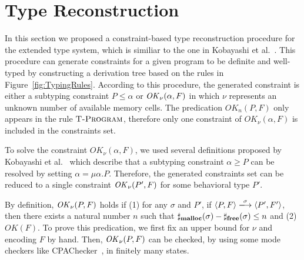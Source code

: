 \section{Type Reconstruction}
\label{sec:reconstruction}
In this section we proposed a constraint-based type reconstruction
procedure for the extended type system, which is similiar to the one
in Kobayashi et al.~\cite{DBLP:journals/lmcs/KobayashiSW06}.  This
procedure can generate constraints for a given program to be definite
and well-typed by constructing a derivation tree based on the rules in
Figure~\ref{fig:TypingRules}. According to this procedure, the
generated constraint is either a subtyping constraint \(P \le \alpha
\) or \(\mathit{OK}_\nu(\alpha, F)\) in which \(\nu\) represents an unknown
number of available memory cells. The predication \(OK_n(P, F)\) only
appears in the rule \(\textsc{T-Program}\), therefore only one constraint of
\(OK_\nu(\alpha, F)\) is included in the constraints set.

To solve the constraint \(OK_\nu(\alpha, F)\), we used several
definitions proposed by Kobayashi et al.~\cite[Lemma
  3.8]{DBLP:journals/lmcs/KobayashiSW06} which describe that a
subtyping constraint \(\alpha \ge P\) can be resolved by setting
\(\alpha = \mu \alpha. P\).  Therefore, the generated constraints set
can be reduced to a single constraint \(\mathit{OK}_{\nu}(P', F)\) for some
behavioral type \(P'\).

By definition, \(\mathit{OK}_{\nu}(P, F)\) holds if (1) for any \(\sigma\) and
\(P'\), if \(\langle P, F \rangle \xlongrightarrow{\sigma} \langle P',
F'\rangle \), then there exists a natural number \(n\) such that
\(\sharp_{\mathbf{malloc}}(\sigma) - \sharp_{\mathbf{free}}(\sigma) \le n\) and (2)
\(OK(F)\). To prove this predication, we first fix an upper bound for
\(\nu\) and encoding \(F\) by hand.  Then, \(\mathit{OK}_{\nu}(P, F)\) can be
checked, by using some mode checkers like
CPAChecker~\cite{beyer2011cpachecker}, in finitely many states.

